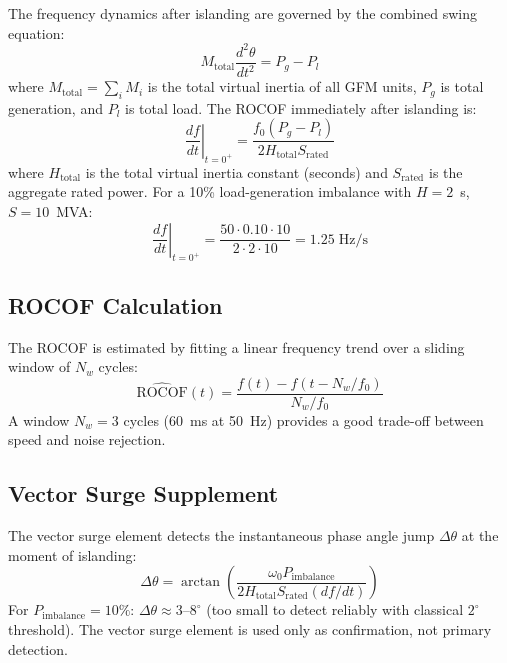 The frequency dynamics after islanding are governed by the combined
swing equation:
\begin{equation}
  M_\mathrm{total} \frac{d^2\theta}{dt^2} = P_g - P_l
  \label{eq:ch6_swing}
\end{equation}
where $M_\mathrm{total} = \sum_i M_i$ is the total virtual inertia of
all GFM units, $P_g$ is total generation, and $P_l$ is total load.
The ROCOF immediately after islanding is:
\begin{equation}
  \left.\frac{df}{dt}\right|_{t=0^+} = \frac{f_0 (P_g - P_l)}{2H_\mathrm{total} S_\mathrm{rated}}
  \label{eq:ch6_rocof}
\end{equation}
where $H_\mathrm{total}$ is the total virtual inertia constant (seconds)
and $S_\mathrm{rated}$ is the aggregate rated power. For a 10\% load-generation
imbalance with $H = 2$~s, $S = 10$~MVA:
\begin{equation}
  \left.\frac{df}{dt}\right|_{t=0^+}
  = \frac{50 \cdot 0.10 \cdot 10}{2 \cdot 2 \cdot 10} = 1.25\;\mathrm{Hz/s}
  \label{eq:ch6_rocof_example}
\end{equation}

\subsection{ROCOF Calculation}

The ROCOF is estimated by fitting a linear frequency trend over a
sliding window of $N_w$ cycles:
\begin{equation}
  \widehat{\mathrm{ROCOF}}(t) = \frac{f(t) - f(t - N_w/f_0)}{N_w/f_0}
  \label{eq:ch6_rocof_est}
\end{equation}
A window $N_w = 3$ cycles (60~ms at 50~Hz) provides a good trade-off
between speed and noise rejection.

\subsection{Vector Surge Supplement}

The vector surge element detects the instantaneous phase angle jump
$\Delta\theta$ at the moment of islanding:
\begin{equation}
  \Delta\theta = \arctan\!\left(\frac{\omega_0 P_\mathrm{imbalance}}
    {2 H_\mathrm{total} S_\mathrm{rated} (df/dt)}\right)
  \label{eq:ch6_vector_surge}
\end{equation}
For $P_\mathrm{imbalance} = 10\%$: $\Delta\theta \approx 3$--$8^\circ{}$ (too
small to detect reliably with classical $2^\circ$ threshold). The vector surge
element is used only as confirmation, not primary detection.


